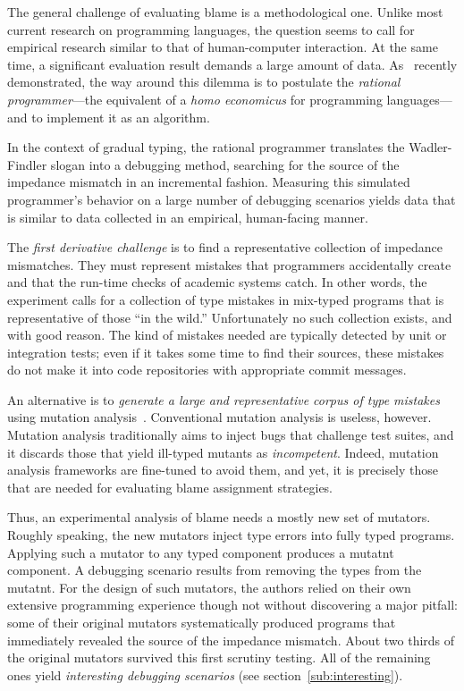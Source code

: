 
The general challenge of evaluating blame is a methodological one. Unlike most
current research on programming languages, the question seems to call for
empirical research similar to that of human-computer interaction. At the same
time, a significant evaluation result demands a large amount of
data. As~\citet{lksfd-popl-2020} recently demonstrated, the way around this
dilemma is to postulate the {\em rational programmer\/}---the equivalent of a
{\it homo economicus\/} for programming languages---and to implement it as an algorithm.

In the context of gradual typing, the rational programmer translates the
Wadler-Findler slogan into a debugging method, searching for the source of the
impedance mismatch in an incremental fashion. Measuring this simulated
programmer's behavior on a large number of debugging scenarios yields data that
is similar to data collected in an empirical, human-facing manner.

The {\em first derivative challenge\/} is to find a representative collection of
impedance mismatches. They must represent mistakes that programmers accidentally
create and that the run-time checks of academic systems catch. In other words,
the experiment calls for a collection of type mistakes in mix-typed programs
that is representative of those ``in the wild.''  Unfortunately no such
collection exists, and with good reason. The kind of mistakes needed are
typically detected by unit or integration tests; even if it takes some time to
find their sources, these mistakes do not make it into code repositories with
appropriate commit messages.

An alternative is to {\em generate a large and representative corpus of type
mistakes \/} using mutation analysis~\cite{lipton1971fault, demillo1978hints,
jia2011analysis}.  Conventional mutation analysis is useless, however. Mutation
analysis traditionally aims to inject bugs that challenge test suites, and it
discards those that yield ill-typed mutants as \emph{incompetent}.  Indeed,
mutation analysis frameworks are fine-tuned to avoid them, and yet, it is
precisely those that are needed for evaluating blame assignment strategies.

Thus, an experimental analysis of blame needs a mostly new set of mutators.
Roughly speaking, the new mutators inject type errors into fully typed programs.
Applying such a mutator to any typed component produces a mutatnt component.  A
debugging scenario results from removing the types from the mutatnt. For the
design of such mutators, the authors relied on their own extensive programming
experience though not without discovering a major pitfall: some of their
original mutators systematically produced programs that immediately revealed the
source of the impedance mismatch. About two thirds of the original mutators
survived this first scrutiny testing. All of the remaining ones yield {\em
interesting debugging scenarios\/} (see section~\ref{sub:interesting}).

